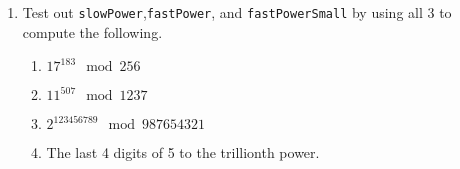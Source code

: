 \documentclass[11pt]{article}
\begin{document}
\begin{enumerate}
{\begin{enumerate}
{\begin{enumerate}[(1)]
{      If $A>0$ go back to step 2.  Otherwise return $b$.
      }
    \end{enumerate}
    Think about why this algorithm works and how fast it should be while you're writing it.  You will be proving the correctness and analyzing time complexity in the written part of this assignment.
    }
  \end{enumerate}
  }
  \item{
  Test out \verb|slowPower|,\verb|fastPower|, and \verb|fastPowerSmall| by using all 3 to compute the following.
  \begin{enumerate}
    \item{
    $17^{183}\mod256$
    }
    \item{
    $11^{507}\mod1237$
    }
    \item{
    $2^{123456789}\mod987654321$
    }
    \item{
    The last 4 digits of 5 to the trillionth power.
    }
  \end{enumerate}
  }
\end{enumerate}
\end{document}
